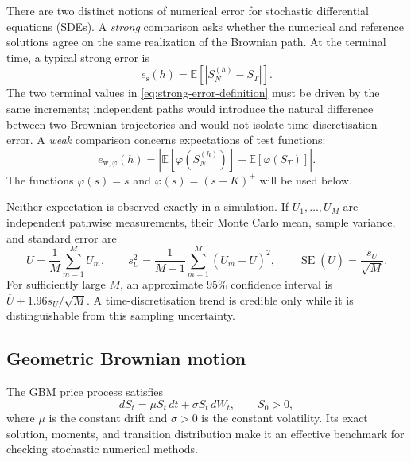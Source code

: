 There are two distinct notions of numerical error for stochastic differential
equations (SDEs).  A \emph{strong} comparison asks whether the numerical and
reference solutions agree on the same realization of the Brownian path.  At
the terminal time, a typical strong error is
\begin{equation}
    e_{\mathrm{s}}(h)
    =\mathbb{E}\!\left[\left|S_N^{(h)}-S_T\right|\right].
    \label{eq:strong-error-definition}
\end{equation}
The two terminal values in \eqref{eq:strong-error-definition} must be driven by
the same increments; independent paths would introduce the natural difference
between two Brownian trajectories and would not isolate time-discretisation
error.  A \emph{weak} comparison concerns expectations of test functions:
\begin{equation}
    e_{\mathrm{w},\varphi}(h)
    =\left|\mathbb{E}\!\left[\varphi(S_N^{(h)})\right]
          -\mathbb{E}\!\left[\varphi(S_T)\right]\right|.
    \label{eq:weak-error-definition}
\end{equation}
The functions $\varphi(s)=s$ and $\varphi(s)=(s-K)^+$ will be used below.

Neither expectation is observed exactly in a simulation.  If $U_1,\ldots,U_M$
are independent pathwise measurements, their Monte Carlo mean, sample
variance, and standard error are
\begin{equation}
    \overline{U}=\frac{1}{M}\sum_{m=1}^{M}U_m,
    \qquad
    s_U^2=\frac{1}{M-1}\sum_{m=1}^{M}(U_m-\overline{U})^2,
    \qquad
    \operatorname{SE}(\overline{U})=\frac{s_U}{\sqrt{M}}.
    \label{eq:mc-summary}
\end{equation}
For sufficiently large $M$, an approximate $95\%$ confidence interval is
$\overline{U}\pm1.96s_U/\sqrt{M}$.  A time-discretisation trend is credible
only while it is distinguishable from this sampling uncertainty.

\subsection{Geometric Brownian motion}
\label{subsec:gbm-theory}

The GBM price process satisfies
\begin{equation}
    dS_t=\mu S_t\,dt+\sigma S_t\,dW_t,
    \qquad S_0>0,
    \label{eq:gbm-sde}
\end{equation}
where $\mu$ is the constant drift and $\sigma>0$ is the constant volatility.
Its exact solution, moments, and transition distribution make it an effective
benchmark for checking stochastic numerical methods.


